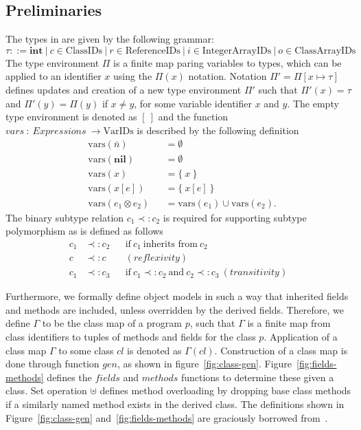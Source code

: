 \subsection{Preliminaries}
\label{subsec:preliminaries}
The types in \rooplpp are given by the following grammar:
\begin{equation*}
    \tau ::= \textbf{int}\ |\ c \in \text{ClassIDs}\ |\ r \in \text{ReferenceIDs}\ |\ i \in \text{IntegerArrayIDs}\ |\ o \in \text{ClassArrayIDs}
\end{equation*}
The type environment $\Pi$ is a finite map paring variables to types, which can be applied to an identifier $x$ using the $\Pi(x)$ notation. Notation $\Pi' = \Pi[x \mapsto \tau]$ defines updates and creation of a new type environment $\Pi'$ such that $\Pi'(x) = \tau$ and $\Pi'(y) = \Pi(y)$ if $x \not= y$, for some variable identifier $x$ and $y$. The empty type environment is denoted as $[\ ]$ and the function $vars\ :\ Expressions\ \to \text{VarIDs}$ is described by the following definition
\begin{align*}
    &\text{vars}(\bar{n}) &&= \emptyset\\
    &\text{vars}(\textbf{nil}) &&= \emptyset\\
    &\text{vars}(x) &&= \{\ x\ \}\\
    &\text{vars}(x[e]) &&= \{\ x[e]\ \}\\
    &\text{vars}(e_1 \otimes e_2) &&= \text{vars}(e_1) \cup \text{vars}(e_2).
\end{align*}
The binary subtype relation $c_1 \prec: c_2$ is required for supporting subtype polymorphism as is defined as follows
\begin{align*}
    c_1 &\prec: c_2 &&\text{if}\ c_1\ \text{inherits from}\ c_2\\
    c   &\prec: c   &&(reflexivity)\\
    c_1 &\prec: c_3 &&\text{if}\ c_1 \prec: c_2\ \text{and}\ c_2 \prec: c_3\ (transitivity)
\end{align*}

Furthermore, we formally define object models in such a way that inherited fields and methods are included, unless overridden by the derived fields. Therefore, we define $\Gamma$ to be the class map of a program $p$, such that $\Gamma$ is a finite map from class identifiers to tuples of methods and fields for the class $p$. Application of a class map $\Gamma$ to some class $cl$ is denoted as $\Gamma(cl)$. Construction of a class map is done through function $gen$, as shown in figure~\ref{fig:class-gen}. Figure~\ref{fig:fields-methods} defines the $fields$ and $methods$ functions to determine these given a class. Set operation $\uplus$ defines method overloading by dropping base class methods if a similarly named method exists in the derived class. The definitions shown in Figure~\ref{fig:class-gen} and~\ref{fig:fields-methods} are graciously borrowed from~\cite{th:roopl}.
 

